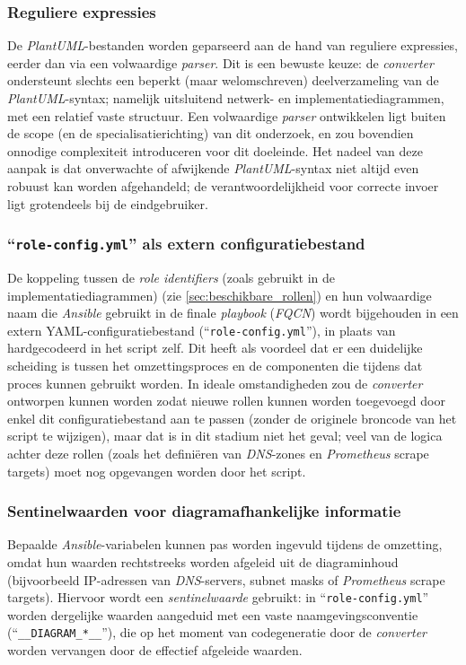 \subsubsection{Reguliere expressies}

De \emph{PlantUML}-bestanden worden geparseerd aan de hand van reguliere expressies, eerder dan via een volwaardige \emph{parser}.
Dit is een bewuste keuze: de \emph{converter} ondersteunt slechts een beperkt (maar welomschreven) deelverzameling van de \emph{PlantUML}-syntax; namelijk uitsluitend netwerk- en implementatiediagrammen, met een relatief vaste structuur.
Een volwaardige \emph{parser} ontwikkelen ligt buiten de scope (en de specialisatierichting) van dit onderzoek, en zou bovendien onnodige complexiteit introduceren voor dit doeleinde. Het nadeel van deze aanpak is dat onverwachte of afwijkende \emph{PlantUML}-syntax niet altijd even robuust kan worden afgehandeld; de verantwoordelijkheid voor correcte invoer ligt grotendeels bij de eindgebruiker.

\subsubsection{``\texttt{role-config.yml}'' als extern configuratiebestand}

De koppeling tussen de \emph{role identifiers} (zoals gebruikt in de implementatiediagrammen) (zie \autoref{sec:beschikbare_rollen}) en hun volwaardige naam die \emph{Ansible} gebruikt in de finale \emph{playbook} (\emph{FQCN}) wordt bijgehouden in een extern YAML-configuratiebestand (``\texttt{role-config.yml}''), in plaats van hardgecodeerd in het script zelf.
Dit heeft als voordeel dat er een duidelijke scheiding is tussen het omzettingsproces en de componenten die tijdens dat proces kunnen gebruikt worden.
In ideale omstandigheden zou de \emph{converter} ontworpen kunnen worden zodat nieuwe rollen kunnen worden toegevoegd door enkel dit configuratiebestand aan te passen (zonder de originele broncode van het script te wijzigen), maar dat is in dit stadium niet het geval; veel van de logica achter deze rollen (zoals het definiëren van \emph{DNS}-zones en \emph{Prometheus} scrape targets) moet nog opgevangen worden door het script.

\subsubsection{Sentinelwaarden voor diagramafhankelijke informatie}

Bepaalde \emph{Ansible}-variabelen kunnen pas worden ingevuld tijdens de omzetting, omdat hun waarden rechtstreeks worden afgeleid uit de diagraminhoud (bijvoorbeeld IP-adressen van \emph{DNS}-servers, subnet masks of \emph{Prometheus} scrape targets). Hiervoor wordt een \emph{sentinelwaarde} gebruikt: in ``\texttt{role-config.yml}'' worden dergelijke waarden aangeduid met een vaste naamgevingsconventie (``\texttt{\_\_DIAGRAM\_*\_\_}''), die op het moment van codegeneratie door de \emph{converter} worden vervangen door de effectief afgeleide waarden.

